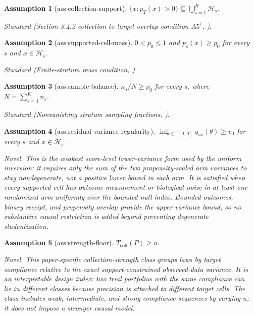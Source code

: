 \documentclass{article}
\newtheorem{assumption}{Assumption}
\begin{document}
\begin{assumption}[ass:collection-support]\label{ass:collection-support}
\(\{x:p_T(x)>0\}\subseteq\bigcup_{s=1}^K\mathcal H_s\).
\par\smallskip\noindent\emph{Standard} (Section 3.4.2 collection-to-target overlap condition \(A5^{\dagger}\), \cite{DahabrehRobertsonPetitoHernanSteingrimsson2023}).
\end{assumption}

\begin{assumption}[ass:supported-cell-mass]\label{ass:supported-cell-mass}
\(0<p_0\le1\) and \(p_s(x)\ge p_0\) for every \(s\) and \(x\in\mathcal H_s\).
\par\smallskip\noindent\emph{Standard} (Finite-stratum mass condition, \cite{DahabrehRobertsonPetitoHernanSteingrimsson2023}).
\end{assumption}

\begin{assumption}[ass:sample-balance]\label{ass:sample-balance}
\(n_s/N\ge\rho_0\) for every \(s\), where \(N=\sum_{s=1}^K n_s\).
\par\smallskip\noindent\emph{Standard} (Nonvanishing stratum sampling fractions, \cite{DahabrehRobertsonPetitoHernanSteingrimsson2023}).
\end{assumption}

\begin{assumption}[ass:residual-variance-regularity]\label{ass:residual-variance-regularity}
\(\inf_{\theta\in[-1,1]}q_{sx}(\theta)\ge v_0\) for every \(s\) and \(x\in\mathcal H_s\).
\par\smallskip\noindent\emph{Novel.} This is the weakest score-level lower-variance form used by the uniform inversion: it requires only the sum of the two propensity-scaled arm variances to stay nondegenerate, not a positive lower bound in each arm. It is satisfied when every supported cell has outcome measurement or biological noise in at least one randomized arm uniformly over the bounded null index. Bounded outcomes, binary receipt, and propensity overlap provide the upper variance bound, so no substantive causal restriction is added beyond preventing degenerate studentization.
\end{assumption}

\begin{assumption}[ass:strength-floor]\label{ass:strength-floor}
\(T_{\mathrm{coll}}(P)\ge u\).
\par\smallskip\noindent\emph{Novel.} This paper-specific collection-strength class groups laws by target compliance relative to the exact support-constrained observed-data variance. It is an interpretable design index: two trial portfolios with the same compliance can lie in different classes because precision is attached to different target cells. The class includes weak, intermediate, and strong compliance sequences by varying \(u\); it does not impose a stronger causal model.
\end{assumption}
\end{document}
